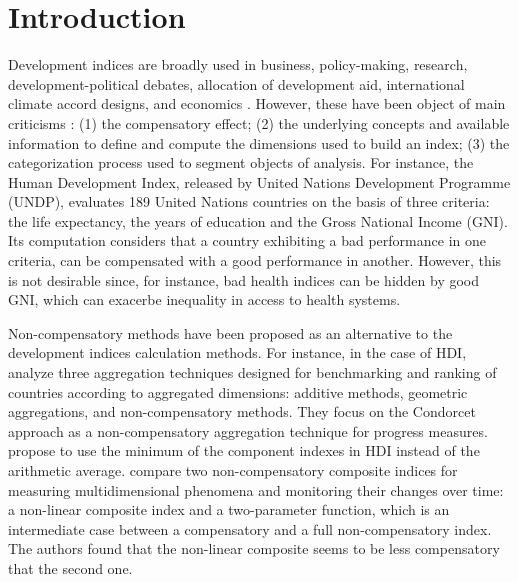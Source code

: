 \documentclass[]{elsarticle}
\theoremstyle{definition}
\begin{document}
\section{Introduction}


Development indices  are broadly used in business, policy-making, research, development-political debates, allocation of development aid, international climate accord designs, and economics \citep{Wolff2011}. However, these have been object of  main criticisms \citep{Noorbakhsh1998, Berenger2007, Klugman2011, Martinez2013}: (1) the compensatory effect; (2) the underlying concepts and available information to define and compute the dimensions used to build an index; (3) the categorization process used to segment objects of analysis.  For instance, the Human Development Index, released by United Nations Development Programme (UNDP),   evaluates  189 United Nations countries on the basis of three criteria: the life expectancy, the years of education and the Gross National Income (GNI).  Its computation considers that a country exhibiting a bad performance in one criteria, can be compensated with a good performance in another. However, this is not desirable since, for instance, bad health indices can be hidden by good GNI, which can exacerbe inequality in access to health systems.   

Non-compensatory  methods have been proposed as an alternative to the development indices calculation methods. For instance, in the case of HDI, \cite{Natoli2011} analyze three aggregation techniques designed for benchmarking and ranking of countries according to aggregated dimensions: additive methods, geometric aggregations, and non-compensatory methods.  They focus on the Condorcet approach as a non-compensatory aggregation technique for progress measures.  \cite{Lozano2009} propose to use the minimum of the component indexes in HDI instead of the arithmetic average. \cite{Mazziotta2015} compare two non-compensatory composite indices for measuring multidimensional phenomena and monitoring their changes over time: a non-linear composite index and a two-parameter function, which is an intermediate case between a compensatory and a full non-compensatory index. The authors found that the non-linear composite seems to be less compensatory that the second one. 
\end{document}
